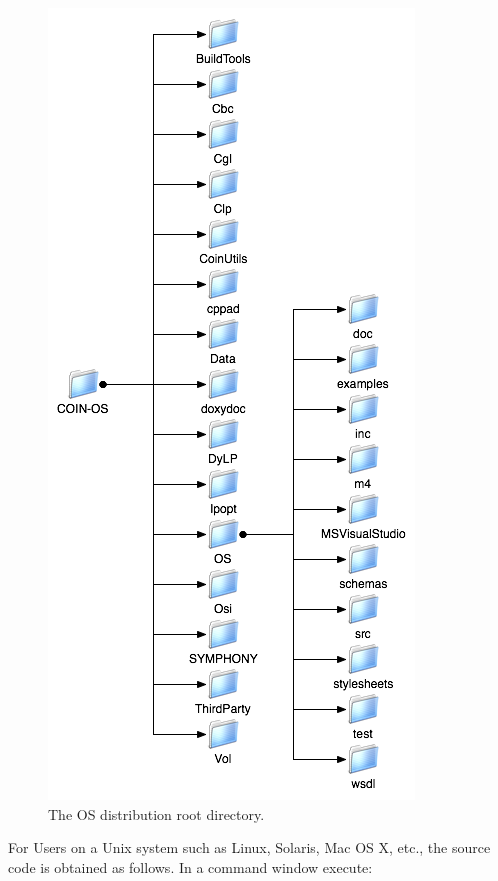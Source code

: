\documentclass[11pt]{article}
\newcommand{\figurepath}{./figures}
\renewcommand{\_}{{\char"5F}}
\renewcommand{\{}{{\char"7B}}
\renewcommand{\}}{{\char"7D}}
\renewcommand{\^}{{\char"0D}}
\renewcommand{\'}{{\char"0D}}
\begin{document}
\begin{figure}
\centering
\includegraphics[scale=0.7]{./figures/OSProjectRootDirectory.png}
\caption{The OS distribution root directory.}
\label{figure:osprojectrootdir}
\end{figure}

\medskip

For Users on a Unix system such as Linux, Solaris, Mac OS X, etc., 
the source code is obtained as follows. In a command window execute:

\end{document}
